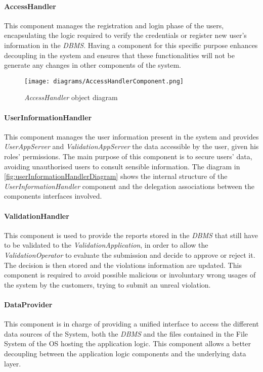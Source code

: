 \paragraph{AccessHandler}
This component manages the registration and login phase of the users, encapsulating the logic required to verify the credentials or register new user's information in the \textit{DBMS}. Having a component for this specific purpose enhances decoupling in the system and ensures that these functionalities will not be generate any changes in other components of the system.\newline\newline
\begin{figure}[h!]
	\centering
	\texttt{[image: diagrams/AccessHandlerComponent.png]}
	\caption{
		\label{fig:accessHandlerComponentDiagram} 
		\emph{AccessHandler} object diagram
	}
\end{figure}
\paragraph{UserInformationHandler}
This component manages the user information present in the system and provides \textit{UserAppServer} and \textit{ValidationAppServer} the data accessible by the user, given his roles' permissions. The main purpose of this component is to secure users' data, avoiding unauthorised users to consult sensible information. The diagram in \autoref{fig:userInformationHandlerDiagram} shows the internal structure of the \textit{UserInformationHandler} component and the delegation associations between the components interfaces involved.
\paragraph{ValidationHandler}
This component is used to provide the reports stored in the \textit{DBMS} that still have to be validated to the \textit{ValidationApplication}, in order to allow the \textit{ValidationOperator} to evaluate the submission and decide to approve or reject it. The decision is then stored and the violations information are updated. This component is required to avoid possible malicious or involuntary wrong usages of the system by the customers, trying to submit an unreal violation.
\paragraph{DataProvider}
This component is in charge of providing a unified interface to access the different data sources of the System, both the \textit{DBMS} and the files contained in the File System of the OS hosting the application logic. This component allows a better decoupling between the application logic components and the underlying data layer. \newline\newline

